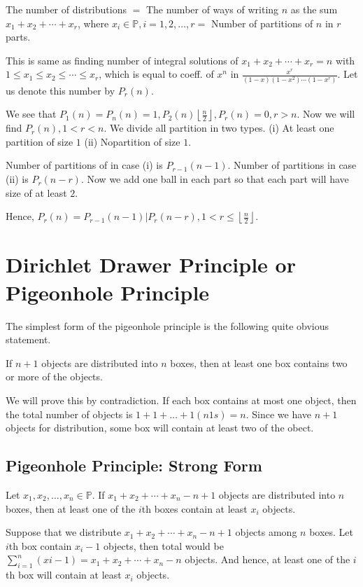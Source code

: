 The number of distributions $=$ The number of ways of writing $n$ as the sum $x_1 + x_2 + \cdots + x_r$,
where $x_i\in\mathbb{P}, i = 1, 2, \ldots, r =$ Number of partitions of $n$ in $r$ parts.

This is same as finding number of integral solutions of $x_1 + x_2 + \cdots + x_r = n$ with $1\leq x_1\leq
x_2\leq \cdots \leq x_r$, which is equal to coeff. of $x^n$ in $\frac{x^r}{(1 - x)(1 - x^2)\cdots(1 -
  x^r)}$. Let us denote this number by $P_r(n)$.

We see that $P_1(n) = P_n(n) = 1, P_2(n) \left\lfloor \frac{n}{2}\right\rfloor, P_r(n) = 0, r > n$. Now we
will find $P_r(n), 1< r < n$. We divide all partition in two types. (i) At least one partition of size $1$
(ii) Nopartition of size $1$.

Number of partitions of in case (i) is $P_{r - 1}(n - 1)$. Number of partitions in case (ii) is $P_r(n -
r)$. Now we add one ball in each part so that each part will have size of at least $2$.

Hence, $P_r(n) = P_{r - 1}(n - 1) | P_r(n - r), 1 < r\leq \left\lfloor \frac{n}{2}\right\rfloor$.

\section{Dirichlet Drawer Principle or Pigeonhole Principle}
The simplest form of the pigeonhole principle is the following quite obvious statement.

\starttheorem
  If $n + 1$ objects are distributed into $n$ boxes, then at least one box contains two or more of the objects.
\stoptheorem

\startproof
  We will prove this by contradiction. If each box contains at most one object, then the total number of
  objects is $1 + 1 + \ldots + 1(n 1s) = n$. Since we have $n + 1$ objects for distribution, some box will
  contain at least two of the obect.
\stopproof

\subsection{Pigeonhole Principle: Strong Form}
\starttheorem
  Let $x_1, x_2, \ldots, x_n\in\mathbb{P}$. If $x_1+ x_2 + \cdots + x_n - n + 1$ objects are distributed
  into $n$ boxes, then at least one of the $i$th boxes contain at least $x_i$ objects.
\stoptheorem

\startproof
  Suppose that we distribute $x_1 + x_2 + \cdots + x_n - n + 1$ objects among $n$ boxes. Let $i$th box
  contain $x_i - 1$ objects, then total would be $\displaystyle\sum_{i=1}^n(xi - 1) = x_1 + x_2 + \cdots +
  x_n - n$ objects. And hence, at least one of the $i$th box will contain at least $x_i$ objects.
\stopproof

